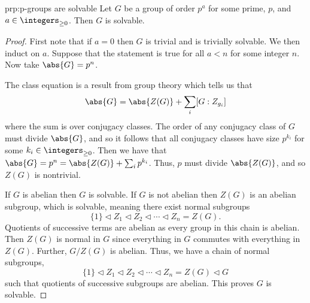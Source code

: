 \documentclass[fleqn]{NotesClass}
\newcommand{\normalsub}{\mathrel{\lhd}}
\begin{document}
    \begin{prp}{}{prp:p-groups are solvable}
        Let \(G\) be a group of order \(p^a\) for some prime, \(p\), and \(a \in \integers_{\ge 0}\).
        Then \(G\) is solvable.
        \begin{proof}
            First note that if \(a = 0\) then \(G\) is trivial and is trivially solvable.
            We then induct on \(a\).
            Suppose that the statement is true for all \(a < n\) for some integer \(n\).
            Now take \(\abs{G} = p^n\).
            
            The class equation is a result from group theory which tells us that
            \begin{equation}
                \abs{G} = \abs{Z(G)} + \sum_i [G : Z_{g_i}]
            \end{equation}
            where the sum is over conjugacy classes.
            The order of any conjugacy class of \(G\) must divide \(\abs{G}\), and so it follows that all conjugacy classes have size \(p^{k_i}\) for some \(k_i \in \integers_{\ge 0}\).
            Then we have that \(\abs{G} = p^n = \abs{Z(G)} + \sum_i p^{k_i}\).
            Thus, \(p\) must divide \(\abs{Z(G)}\), and so \(Z(G)\) is nontrivial.
            
            If \(G\) is abelian then \(G\) is solvable.
            If \(G\) is not abelian then \(Z(G)\) is an abelian subgroup, which is solvable, meaning there exist normal subgroups
            \begin{equation}
                \{1\} \normalsub Z_1 \normalsub Z_2 \normalsub \dotsb \normalsub Z_n = Z(G).
            \end{equation}
            Quotients of successive terms are abelian as every group in this chain is abelian.
            Then \(Z(G)\) is normal in \(G\) since everything in \(G\) commutes with everything in \(Z(G)\).
            Further, \(G/Z(G)\) is abelian.
            Thus, we have a chain of normal subgroups,
            \begin{equation}
                \{1\} \normalsub Z_1 \normalsub Z_2 \normalsub \dotsb \normalsub Z_n = Z(G) \normalsub G
            \end{equation}
            such that quotients of successive subgroups are abelian.
            This proves \(G\) is solvable.
        \end{proof}
    \end{prp}
    
\end{document}
